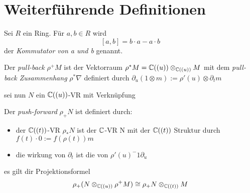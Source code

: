 \section{Weiterführende Definitionen}

\begin{defn}[Kommutator]%
  Sei $R$ ein Ring. Für $a,b\in R$ wird
  \[[a,b]=b\cdot a-a\cdot b\]
  der \emph{Kommutator von a und b} genannt.
\end{defn}

\begin{defn}
  Der \emph{pull-back} $\rho^{+}M$ ist der Vektorraum
  $\rho^{*}M={\mathbb C}((u))\otimes_{{\mathbb C}((u))}M$ mit
  dem \emph{pull-back Zusammenhang} $\rho^*\nabla$ definiert durch
  $\partial_u(1\otimes m):=\rho'(u)\otimes\partial_tm$
\end{defn}

sei nun $N$ ein ${\mathbb C}((u))$-VR mit Verknüpfung
\begin{defn}
  Der \emph{push-forward} $\rho_+N$ ist definiert durch:
  \begin{itemize}
    \item der ${\mathbb C}((t))$-VR $\rho_*N$ ist der ${\mathbb C}$-VR N mit der ${\mathbb C}((t))$
      Struktur durch $f(t)\cdot 0:=f(\rho(t))m$
    \item die wirkung von $\partial_t$ ist die von $\rho'(u)^-1\partial_u$
  \end{itemize}
\end{defn}
\begin{thm} \label{thm:Projektionsformel}
  es gilt dir Projektionsformel
  \begin{equation} \label{eq:Projektionsformel}
    \rho_+(N\otimes_{{\mathbb C}((u))}\rho^+M)\cong\rho_+N\otimes_{{\mathbb C}((t))}M
  \end{equation}
\end{thm}

\begin{comment}
  TEST für ref\\
  \ref{thm:Projektionsformel}\\
  TEST für eqref\\
  \eqref{eq:Projektionsformel}\\
\end{comment}

